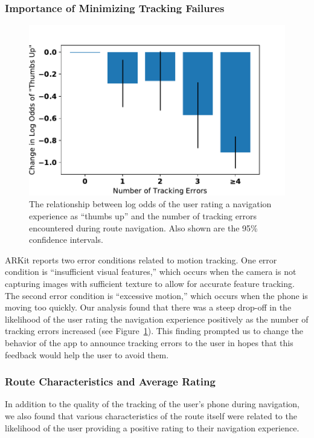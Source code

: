 \documentclass[chi_draft]{sigchi}
\begin{document}
\subsubsection{Importance of Minimizing Tracking Failures}
\begin{figure}
\includegraphics[width=\linewidth]{figures/trackingerrors}
\caption{The relationship between log odds of the user rating a navigation experience as ``thumbs up'' and the number of tracking errors encountered during route navigation.  Also shown are the 95\% confidence intervals.\label{fig:trackingerrors}}
\end{figure}

ARKit reports two error conditions related to motion tracking.  One error condition is ``insufficient visual features,'' which occurs when the camera is not capturing images with sufficient texture to allow for accurate feature tracking.  The second error condition is ``excessive motion,'' which occurs when the phone is moving too quickly.  Our analysis found that there was a steep drop-off in the likelihood of the user rating the navigation experience positively as the number of tracking errors increased (see Figure~\ref{fig:trackingerrors}).  This finding prompted us to change the behavior of the app to announce tracking errors to the user in hopes that this feedback would help the user to avoid them.

\subsubsection{Route Characteristics and Average Rating}
In addition to the quality of the tracking of the user's phone during navigation, we also found that various characteristics of the route itself were related to the likelihood of the user providing a positive rating to their navigation experience.
\end{document}
